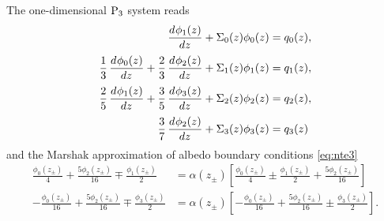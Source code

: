 The one-dimensional $\PN[3]$ system reads 
\begin{equation}
    \label{eq:P3_1d}
	\begin{aligned}
\der{\phi_1(z)}{z} + \Sigma_{0}(z)\phi_0(z)&=q_0(z),\\[.25em]
\frac{1}{3} \,\der{\phi_0(z)}{z} +
\frac{2}{3} \,\der{\phi_2(z)}{z} + \Sigma_{1}(z)\phi_1(z)&=q_1(z),\\[.25em]
\frac{2}{5} \,\der{\phi_1(z)}{z} + 
\frac{3}{5} \,\der{\phi_3(z)}{z} + \Sigma_{2}(z)\phi_2(z)&=q_2(z),\\[.25em]
\frac{3}{7} \,\der{\phi_2(z)}{z} + \Sigma_{3}(z)\phi_3(z)&=q_3(z)
	\end{aligned}
\end{equation}
and the Marshak approximation of albedo boundary conditions \eqref{eq:nte3}
\begin{equation}\label{eq:Marshak}
\begin{aligned}
\frac{\phi _0(z_{\pm})}{4}+\frac{5 \phi _2(z_{\pm})}{16}\mp\frac{\phi _1(z_{\pm})}{2} &= \alpha(z_{\pm})
\left[\frac{\phi _0(z_{\pm})}{4}\pm\frac{\phi _1(z_{\pm})}{2}+\frac{5 \phi _2(z_{\pm})}{16}\right]\\
-\frac{\phi _0(z_{\pm})}{16} +\frac{5 \phi _2(z_{\pm})}{16}\mp\frac{\phi _3(z_{\pm})}{2} &= \alpha(z_{\pm})
\left[-\frac{\phi _0(z_{\pm})}{16} +\frac{5 \phi _2(z_{\pm})}{16}\pm\frac{\phi _3(z_{\pm})}{2}\right].
\end{aligned}
\end{equation}


